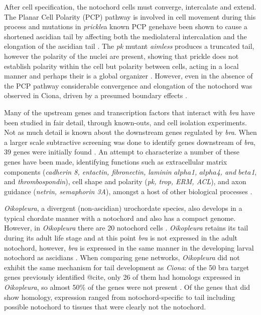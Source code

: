 After cell specification, the notochord cells must converge, intercalate and extend. The Planar Cell Polarity (PCP) pathway is involved in cell movement during this process and mutations in \textit{prickle}\textemdash a known PCP gene\textemdash have been shown to cause a shortened ascidian tail by affecting both the mediolateral intercalation and the elongation of the ascidian tail \cite{jiang_ascidian_2005}. The \textit{pk} mutant \textit{aimless} produces a truncated tail, however the polarity of the nuclei are present, showing that prickle does not establish polarity within the cell but polarity between cells, acting in a local manner and perhaps their is a global organizer \cite{jiang_ascidian_2005,kourakis_one-dimensional_2014}. However, even in the absence of the PCP pathway considerable convergence and elongation of the notochord was observed in Ciona, driven by a presumed boundary effects \cite{veeman_chongmague_2008}.

Many of the upstream genes and transcription factors that interact with \textit{bra} have been studied in fair detail, through known-outs, and cell isolation experiments. Not as much detail is known about the downstream genes regulated by \textit{bra}. When a larger scale subtractive screening was done to identify genes downstream of \textit{bra}, 39 genes were initially found \cite{hotta_temporal_1999}. An attempt to characterize a number of these genes have been made, identifying functions such as extracellular matrix components (\textit{cadherin 8, entactin, fibronectin, laminin $alpha$1, $alpha$4, and $beta$1}, and {\em thrombospondin}), cell shape and polarity (\textit{pk, trop, ERM, ACL}), and axon guidance (\textit{netrin, semaphorin 3A}), amongst a host of other biological processes \cite{hotta_characterization_2000,hotta_brachyury-downstream_2007,kugler_evolutionary_2008}. 

\textit{Oikopleura}, a divergent (non-ascidian) urochordate species, also develops in a typical chordate manner with a notochord and also has a compact genome. However, in {\em Oikopleura} there are 20 notochord cells \cite{seo_miniature_2001,denoeud_plasticity_2010}. \textit{Oikopleura} retains its tail during its adult life stage and at this point \textit{bra} is not expressed in the adult notochord, however, \textit{bra} is expressed in the same manner in the developing larval notochord as ascidians \cite{bassham_brachyury_2000,nishida_development_2008}. When comparing gene networks, \textit{Oikopleura} did not exhibit the same mechanism for tail development as \textit{Ciona}: of the 50 bra target genes previously identified @cite, only 26 of them had homologs expressed in {\em Oikopleura}, so almost 50\% of the genes were not present \cite{kugler_evolutionary_2011}. Of the genes that did show homology, expression ranged from notochord-specific to tail including possible notochord to tissues that were clearly not the notochord.


